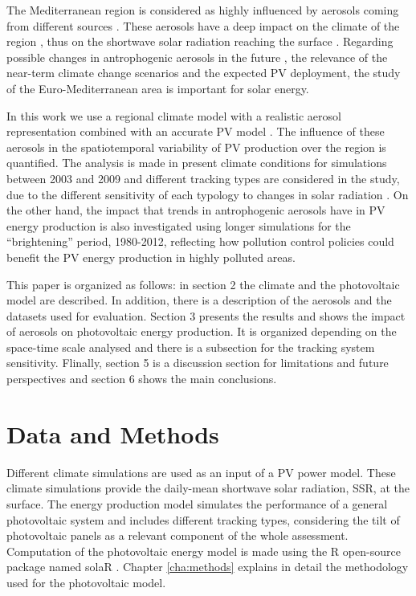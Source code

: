 The Mediterranean region is considered as highly influenced by aerosols coming from different sources \cite*{Lelieveld}. These aerosols have a deep impact on the climate of the region \cite*{Nabat2014, Nabat2014a}, thus on the shortwave solar radiation reaching the surface \cite*{Mallet2016}. Regarding possible changes in antrophogenic aerosols in the future \cite*{Gaetani2014, Jimenez-Guerrero2011}, the relevance of the near-term climate change scenarios and the expected PV deployment, the study of the Euro-Mediterranean area is important for solar energy.

In this work we use a regional climate model \cite*{Nabat2014} with a realistic aerosol representation combined with an accurate PV model \cite*{Lamigueiro2012}. The influence of these aerosols in the spatiotemporal variability of PV production over the region is quantified. The analysis is made in present climate conditions for simulations between 2003 and 2009 and different tracking types are considered in the study, due to the different sensitivity of each typology to changes in solar radiation \cite*{Gutierrez2017}. On the other hand, the impact that trends in antrophogenic aerosols have in PV energy production is also investigated using longer simulations for the ``brightening'' \cite*{Wild2005} period, 1980-2012, reflecting how pollution control policies could benefit the PV energy production in highly polluted areas.

This paper is organized as follows: in section 2 the climate and the photovoltaic model are described. In addition, there is a description of the aerosols and the datasets used for evaluation. Section 3 presents the results and shows the impact of aerosols on photovoltaic energy production. It is organized depending on the space-time scale analysed and there is a subsection for the tracking system sensitivity.  Flinally, section 5 is a discussion section for limitations and future perspectives and section 6 shows the main conclusions.

\section{Data and Methods}

Different climate simulations are used as an input of a PV power model. These climate simulations provide the daily-mean shortwave solar radiation, SSR, at the surface. The energy production model simulates the performance of a general photovoltaic system and includes different tracking types, considering the tilt of photovoltaic panels as a relevant component of the whole assessment. Computation of the photovoltaic energy model is made using the R open-source package named solaR \cite*{Lamigueiro2012}. Chapter \ref{cha:methods} explains in detail the methodology used for the photovoltaic model. 

